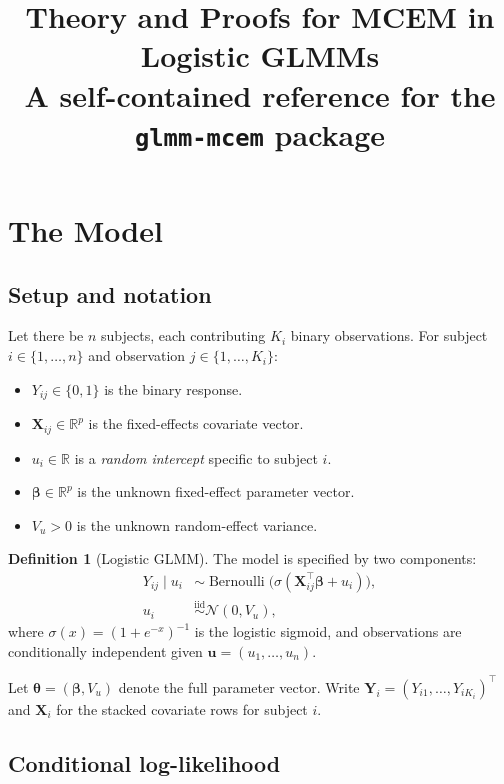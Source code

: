 \documentclass[11pt,a4paper]{article}
\title{\textbf{Theory and Proofs for MCEM in Logistic GLMMs}\\[0.5em]
       \large A self-contained reference for the \texttt{glmm-mcem} package}
\author{}
\date{}
\theoremstyle{definition}
\newtheorem{definition}[theorem]{Definition}
\theoremstyle{remark}
\newcommand{\R}{\mathbb{R}}
\newcommand{\N}{\mathcal{N}}
\newcommand{\sig}{\sigma}           %
\newcommand{\bY}{\mathbf{Y}}
\newcommand{\bX}{\mathbf{X}}
\newcommand{\bu}{\mathbf{u}}
\newcommand{\bbeta}{\boldsymbol{\beta}}
\newcommand{\btheta}{\boldsymbol{\theta}}
\newcommand{\given}{\mid}
\begin{document}
\maketitle
\tableofcontents
\newpage

\section{The Model}

\subsection{Setup and notation}

Let there be $n$ subjects, each contributing $K_i$ binary observations.
For subject $i \in \{1,\ldots,n\}$ and observation $j \in \{1,\ldots,K_i\}$:

\begin{itemize}
  \item $Y_{ij} \in \{0,1\}$ is the binary response.
  \item $\bX_{ij} \in \R^p$ is the fixed-effects covariate vector.
  \item $u_i \in \R$ is a \emph{random intercept} specific to subject $i$.
  \item $\bbeta \in \R^p$ is the unknown fixed-effect parameter vector.
  \item $V_u > 0$ is the unknown random-effect variance.
\end{itemize}

\begin{definition}[Logistic GLMM]
The model is specified by two components:
\begin{align}
  Y_{ij} \given u_i &\sim \operatorname{Bernoulli}\!\bigl(\sig(\bX_{ij}^\top\bbeta + u_i)\bigr), \label{eq:cond-lik}\\
  u_i &\overset{\mathrm{iid}}{\sim} \N(0, V_u), \label{eq:prior}
\end{align}
where $\sig(x) = (1+e^{-x})^{-1}$ is the logistic sigmoid, and observations
are conditionally independent given $\bu = (u_1,\ldots,u_n)$.
\end{definition}

Let $\btheta = (\bbeta, V_u)$ denote the full parameter vector.
Write $\bY_i = (Y_{i1},\ldots,Y_{iK_i})^\top$ and $\bX_i$ for the stacked
covariate rows for subject $i$.

\subsection{Conditional log-likelihood}
\end{document}
